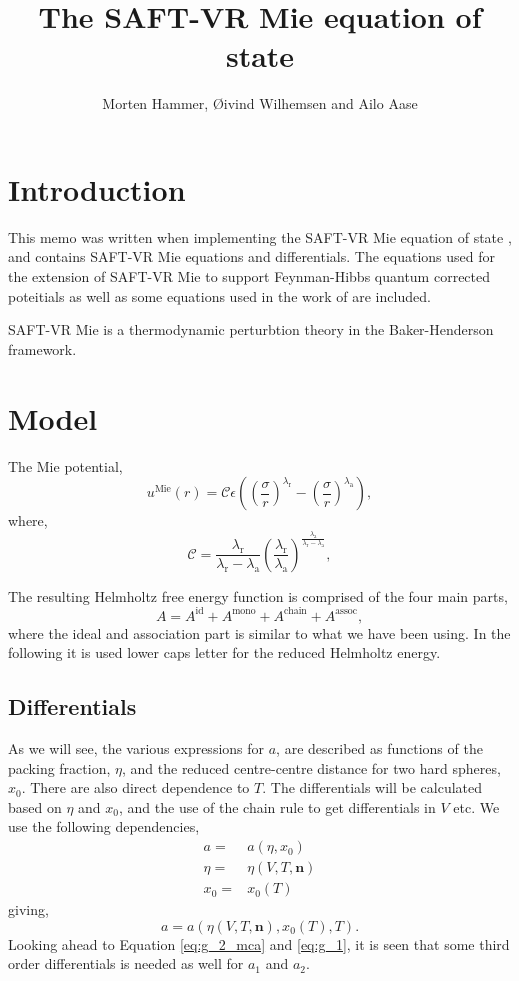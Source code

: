 \documentclass[english]{../thermomemo/thermomemo}
\title{The SAFT-VR Mie equation of state}
\author{Morten Hammer, {\O}ivind Wilhemsen and Ailo Aase}
\newcommand*{\vektor}[1]{\boldsymbol{#1}}%
\newcommand*{\lb}{\left(}
\newcommand*{\rb}{\right)}
\newcommand{\mie}{\text{Mie}\xspace}
\newcommand{\id}{\ensuremath{\text{id}}\xspace}
\newcommand{\mono}{\ensuremath{\text{mono}}\xspace}
\newcommand{\chain}{\ensuremath{\text{chain}}\xspace}
\newcommand{\assoc}{\ensuremath{\text{assoc}}\xspace}
\newcommand{\lama}{\ensuremath{{\lambda_{\text{a}}}}\xspace}
\newcommand{\lamr}{\ensuremath{{\lambda_{\text{r}}}}\xspace}
\begin{document}
\frontmatter
\tableofcontents
\section{Introduction}
This memo was written when implementing the SAFT-VR Mie equation of
state \cite{Lafitte2013}, and contains SAFT-VR Mie equations and
differentials. The equations used for the extension of SAFT-VR Mie to
support Feynman-Hibbs quantum corrected poteitials
\cite{Aasen2019,Aasen2020a} as well as some equations used in the work
of \citet{Hammer2020} are included.

SAFT-VR Mie is a thermodynamic perturbtion theory in the
Baker-Henderson \cite{Barker1967,Barker1976} framework.


\section{Model}

The Mie potential,
\begin{equation}
  \label{eq:Mie}
  u^\mie\lb r\rb = \mathcal{C}\epsilon \lb \lb\frac{\sigma}{r} \rb^\lamr - \lb\frac{\sigma}{r} \rb^\lama \rb,
\end{equation}
where,
\begin{equation}
  \label{eq:C}
  \mathcal{C} = \frac{\lamr}{\lamr - \lama}\lb\frac{\lamr}{\lama} \rb^{\frac{\lama}{\lamr - \lama}},
\end{equation}

The resulting Helmholtz free energy function is comprised of the four main parts,
\begin{equation}
  \label{eq:helm}
  A = A^\id + A^\mono + A^\chain + A^\assoc,
\end{equation}
where the ideal and association part is similar to what we have been
using. In the following it is used lower caps letter for the reduced
Helmholtz energy.

\subsection{Differentials}
As we will see, the various expressions for $a$, are described as
functions of the packing fraction, $\eta$, and the reduced
centre-centre distance for two hard spheres, $x_0$. There are also
direct dependence to $T$. The differentials will be calculated based
on $\eta$ and $x_0$, and the use of the chain rule to get
differentials in $V$ etc. We use the following dependencies,
\begin{align}
  \label{eq:diff_var}
  a =& a \lb \eta, x_0 \rb \\
  \eta =& \eta \lb V, T, \vektor{n} \rb \\
  x_0 =& x_0 \lb T \rb
\end{align}
giving,
\begin{equation}
  \label{eq:a_ms_diff}
  a = a \lb \eta \lb V, T, \vektor{n} \rb, x_0 \lb T \rb, T \rb.
\end{equation}
Looking ahead to Equation \ref{eq:g_2_mca} and \ref{eq:g_1}, it is
seen that some third order differentials is needed as well for $a_1$
and $a_2$.
\end{document}
